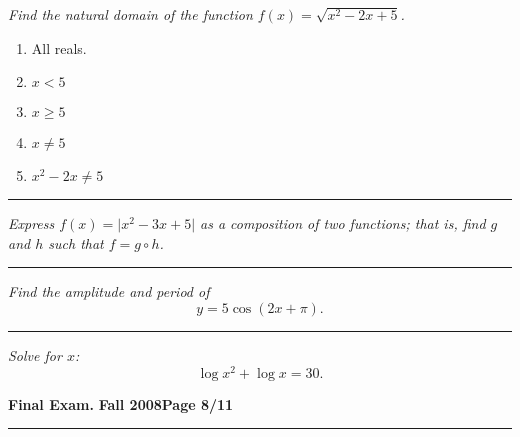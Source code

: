 \documentclass[12pt]{article}
\begin{document}
\bigskip
{\problem[10 pts] \em  Find the natural domain of the function $f(x) = \sqrt{x^2-2x+5}$.}
\begin{enumerate}
\item All reals.
\item $x < 5$
\item $x \geq 5$
\item $x \neq 5$
\item $x^2-2x \neq 5$
\end{enumerate}
\vspace{1cm}
\hrule
{\problem[10pts] \em Express $f(x) = \lvert x^2-3x+5 \rvert$ as a composition of two functions; that is, find $g$ and $h$ such that $f= g \circ h$.}
\vspace{1cm}
\begin{flushright}
\end{flushright}
\hrule
{\problem[10pts] \em Find the amplitude and period of}
\begin{equation*}
y = 5 \cos( 2x + \pi).
\end{equation*}
\vspace{0.5cm}
\begin{flushright}
\end{flushright}
\hrule
{\problem[10 pts] \em Solve for $x$:}
\begin{equation*}
\log x^2 + \log x = 30.
\end{equation*}
\vspace{2cm}
\begin{flushright}
\end{flushright}
\newpage

\hfill{\large\bf Final Exam.}\hfill{\large\bf
  Fall 2008}\hfill{\large\bf Page 8/11}\hrule
  
\end{document}
